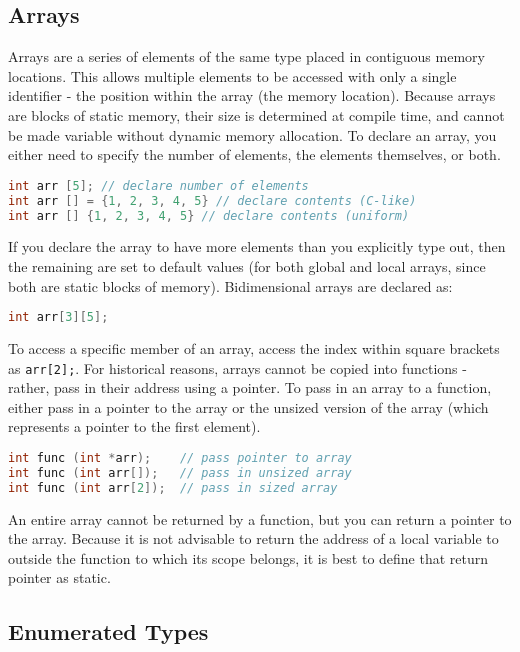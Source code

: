 \documentclass[10pt]{article}
\begin{document}
\subsection{Arrays}

Arrays are a series of elements of the same type placed in contiguous memory locations. This allows multiple elements to be accessed with only a single identifier - the position within the array (the memory location). Because arrays are blocks of static memory, their size is determined at compile time, and cannot be made variable without dynamic memory allocation. To declare an array, you either need to specify the number of elements, the elements themselves, or both.

\begin{lstlisting}[language=C++]
int arr [5]; // declare number of elements
int arr [] = {1, 2, 3, 4, 5} // declare contents (C-like)
int arr [] {1, 2, 3, 4, 5} // declare contents (uniform)
\end{lstlisting}

If you declare the array to have more elements than you explicitly type out, then the remaining are set to default values (for both global and local arrays, since both are static blocks of memory). Bidimensional arrays are declared as:

\begin{lstlisting}[language=C++]
int arr[3][5];
\end{lstlisting}

To access a specific member of an array, access the index within square brackets as \texttt{arr[2];}. For historical reasons, arrays cannot be copied into functions - rather, pass in their address using a pointer. To pass in an array to a function, either pass in a pointer to the array or the unsized version of the array (which represents a pointer to the first element).

\begin{lstlisting}[language=C++]
int func (int *arr); 	// pass pointer to array
int func (int arr[]); 	// pass in unsized array
int func (int arr[2]); 	// pass in sized array
\end{lstlisting}

An entire array cannot be returned by a function, but you can return a pointer to the array. Because it is not advisable to return the address of a local variable to outside the function to which its scope belongs, it is best to define that return pointer as static. 

\subsection{Enumerated Types}
\end{document}
